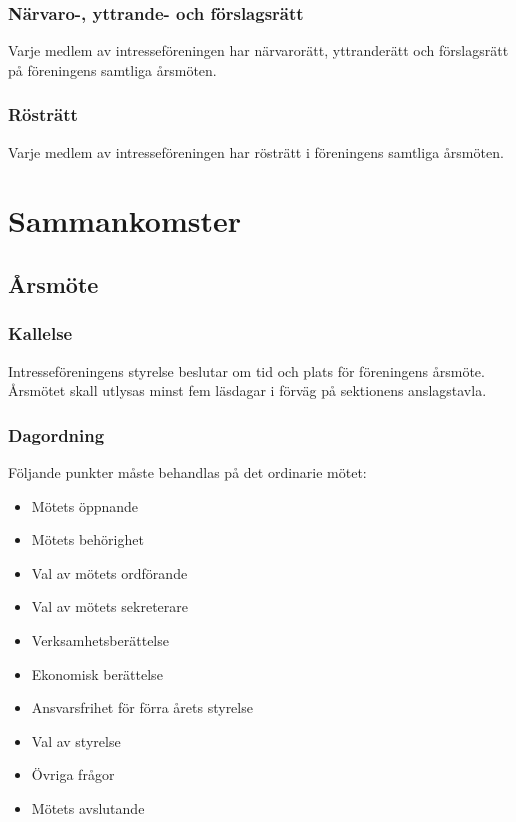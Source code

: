 \documentclass[11pt, noincludeaddress]{classes/cthit}
\begin{document}
\subsubsection{Närvaro-, yttrande- och förslagsrätt}
Varje medlem av intresseföreningen har närvarorätt, yttranderätt och 
förslagsrätt på föreningens samtliga årsmöten.

\subsubsection{Rösträtt}
Varje medlem av intresseföreningen har rösträtt i föreningens 
samtliga årsmöten.

\newpage

\section{Sammankomster}

\subsection{Årsmöte}

\subsubsection{Kallelse}
Intresseföreningens styrelse beslutar om tid och plats för föreningens 
årsmöte. Årsmötet skall utlysas minst fem läsdagar i förväg på 
sektionens anslagstavla.

\subsubsection{Dagordning}
Följande punkter måste behandlas på det ordinarie mötet:

\begin{itemize}
        \item Mötets öppnande
        \item Mötets behörighet
        \item Val av mötets ordförande
        \item Val av mötets sekreterare
        \item Verksamhetsberättelse
        \item Ekonomisk berättelse
        \item Ansvarsfrihet för förra årets styrelse
        \item Val av styrelse
        \item Övriga frågor
        \item Mötets avslutande
\end{itemize}
\end{document}
